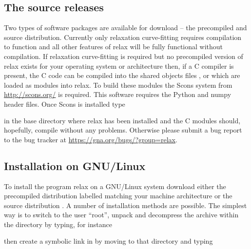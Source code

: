 \subsection{The source releases}
\label{sect: source releases}

Two types of software packages are available for download -- the precompiled and source distribution.  Currently only relaxation curve-fitting requires compilation to function and all other features of relax will be fully functional without compilation.  If relaxation curve-fitting is required but no precompiled version of relax exists for your operating system or architecture then, if a C compiler is present, the C code can be compiled into the shared objects files ,  or  which are loaded as modules into relax.  To build these modules the Scons system from \href{http://scons.org/}{http://scons.org/} is required.  This software requires the Python and numpy header files.  Once Scons is installed type


in the base directory where relax has been installed and the C modules should, hopefully, compile without any problems.  Otherwise please submit a bug report to the bug tracker at \href{https://gna.org/bugs/?group=relax}{https://gna.org/bugs/?group=relax}.



\subsection{Installation on GNU/Linux}

To install the program relax on a GNU/Linux system download either the precompiled distribution labelled  matching your machine architecture or the source distribution .  A number of installation methods are possible.  The simplest way is to switch to the user ``root'', unpack and decompress the archive within the  directory by typing, for instance


then create a symbolic link in  by moving to that directory and typing

